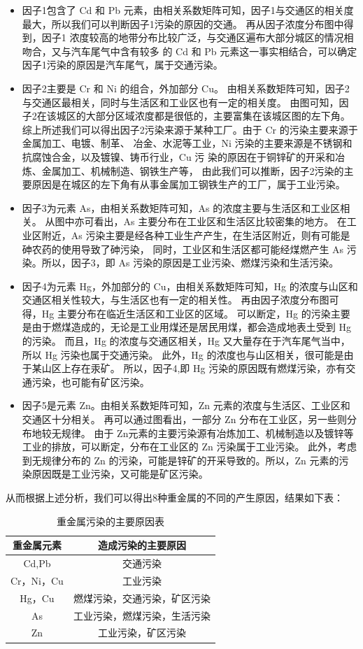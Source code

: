 \documentclass[a4paper]{article}
\begin{document}
\begin{itemize}
\item 因子1包含了 Cd 和 Pb 元素，由相关系数矩阵可知，因子1与交通区的相关度最大，所以我们可以判断因子1污染的原因的交通。
再从因子浓度分布图中得到，因子1 浓度较高的地带分布比较广泛，与交通区遍布大部分城区的情况相吻合，又与汽车尾气中含有较多
的 Cd 和 Pb 元素这一事实相结合，可以确定因子1污染的原因是汽车尾气，属于交通污染。  
\item 因子2主要是 Cr 和 Ni 的组合，外加部分 Cu。 
由相关系数矩阵可知，因子2与交通区最相关，同时与生活区和工业区也有一定的相关度。 
由图可知，因子2在该城区的大部分区域浓度都是很低的，主要富集在该城区图的左下角。
综上所述我们可以得出因子2污染来源于某种工厂。由于 Cr 的污染主要来源于金属加工、电镀、制革、
冶金、水泥等工业，Ni 污染的主要来源是不锈钢和抗腐蚀合金，以及镀镍、铸币行业，Cu 污
染的原因在于铜锌矿的开采和冶炼、金属加工、机械制造、钢铁生产等，
由此我们可以推断，因子2污染的主要原因是在城区的左下角有从事金属加工钢铁生产的工厂，属于工业污染。
\item 因子3为元素 As，由相关系数矩阵可知，As 的浓度主要与生活区和工业区相关。
从图中亦可看出，As 主要分布在工业区和生活区比较密集的地方。
在工业区附近，As 污染主要是经各种工业生产产生，在生活区附近，则有可能是砷农药的使用导致了砷污染，
同时，工业区和生活区都可能经煤燃产生 As 污染。所以，因子3，即 As 污染的原因是工业污染、燃煤污染和生活污染。    
\item 因子4为元素 Hg，外加部分的 Cu，由相关系数矩阵可知，Hg 的浓度与山区和交通区相关性较大，与生活区也有一定的相关性。
再由因子浓度分布图可得，Hg 主要分布在临近生活区和工业区的区域。
可以断定，Hg 的污染主要是由于燃煤造成的，无论是工业用煤还是居民用煤，都会造成地表土受到 Hg 的污染。
而且，Hg 的浓度与交通区相关，Hg 又大量存在于汽车尾气当中，所以 Hg 污染也属于交通污染。
此外，Hg 的浓度也与山区相关，很可能是由于某山区上存在汞矿。
所以，因子4,即 Hg 污染的原因既有燃煤污染，亦有交通污染，也可能有矿区污染。    
\item 因子5是元素 Zn。由相关系数矩阵可知，Zn 元素的浓度与生活区、工业区和交通区十分相关。
再可以通过图看出，一部分 Zn 分布在工业区，另一些则分布地较无规律。
由于 Zn元素的主要污染源有冶炼加工、机械制造以及镀锌等工业的排放，可以断定，分布在工业区的 Zn 污染属于工业污染。
此外，考虑到无规律分布的 Zn 的污染，可能是锌矿的开采导致的。所以，Zn 元素的污染原因既是工业污染，又可能是矿区污染。
\end{itemize}
\indent 从而根据上述分析，我们可以得出8种重金属的不同的产生原因，结果如下表：
\begin{table}[H]
		\centering
		\caption{重金属污染的主要原因表}
		\label{main-reason}
		\begin{tabular}{|c|c|}
		\hline
			重金属元素	  &  造成污染的主要原因 \\
			\hline
			Cd,Pb  &    交通污染  \\  \hline
			Cr，Ni，Cu  &    工业污染 \\ \hline
			Hg，Cu   &   燃煤污染，交通污染，矿区污染 \\ \hline
			As   &	工业污染，燃煤污染，生活污染  \\ \hline
			Zn  &     工业污染，矿区污染        \\ \hline
		\end{tabular}
\end{table}
\end{document}
